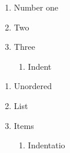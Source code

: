 \documentclass{article}
\begin{document}
	\begin{enumerate}


		\item Number one



		\item Two



		\item Three

		\begin{enumerate}


			\item Indent


		\end{enumerate}
	\end{enumerate}



	\begin{enumerate}


		\item Unordered



		\item List



		\item Items

		\begin{enumerate}


			\item Indentatio


		\end{enumerate}
	\end{enumerate}
\end{document}
